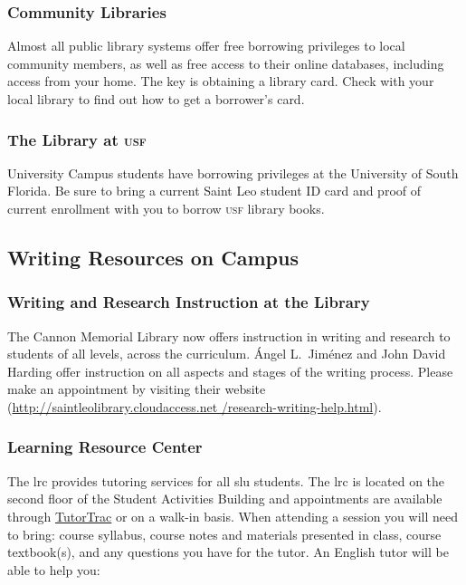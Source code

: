 \documentclass[11pt,oneside]{amsart}	%
\begin{document}
\subsubsection{Community Libraries} %
\label{ssub:community_libraries}
Almost all public library systems offer free borrowing privileges to local community members, as well as free access to their online databases, including access from your home.  The key is obtaining a library card.  Check with your local library to find out how to get a borrower’s card.  

\subsubsection{The Library at \textsc{usf}} %
\label{ssub:the_library_at_}
University Campus students have borrowing privileges at the University of South Florida.  Be sure to bring a current Saint Leo student ID card and proof of current enrollment with you to borrow \textsc{usf} library books.


\subsection{Writing Resources on Campus} %
\label{sub:writing_resources_on_campus}

\subsubsection{Writing and Research Instruction at the Library} %
\label{ssub:writing_and_research_instruction_at_the_library}
The Cannon Memorial Library now offers instruction in writing and research to students of all levels, across the curriculum. Ángel L.\ Jiménez and John David Harding offer instruction on all aspects and stages of the writing process. Please make an appointment by visiting their website (\href{http://saintleolibrary.cloudaccess.net/research-writing-help.html}{http://saintleolibrary.cloudaccess.net /research-writing-help.html}).


\subsubsection{Learning Resource Center} %
\label{ssub:learning_resource_center}
The \ac{lrc} provides tutoring services for all \ac{slu} students.  The \ac{lrc} is located on the second floor of the Student Activities Building and appointments are available through \href{http://tutoring.saintleo.edu/TracWeb40/Default.html}{TutorTrac} or on a walk-in basis. When attending a session you will need to bring: course syllabus, course notes and materials presented in class, course textbook(s), and any questions you have for the tutor.  An English tutor will be able to help you:
\end{document}
